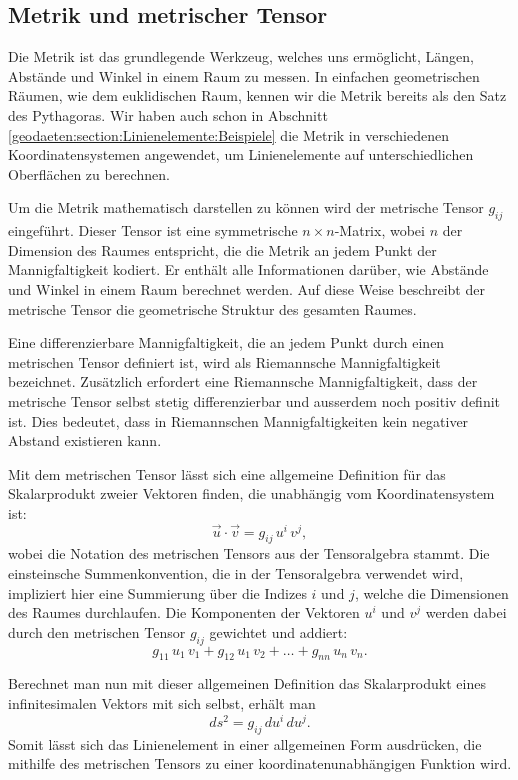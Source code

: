 \subsection{Metrik und metrischer Tensor}

Die Metrik ist das grundlegende Werkzeug, welches uns ermöglicht, Längen, Abstände und Winkel in einem Raum zu messen.
In einfachen geometrischen Räumen, wie dem euklidischen Raum, kennen wir die Metrik bereits als den Satz des Pythagoras.
Wir haben auch schon in Abschnitt \ref{geodaeten:section:Linienelemente:Beispiele} die Metrik in verschiedenen Koordinatensystemen angewendet, um Linienelemente auf unterschiedlichen Oberflächen zu berechnen.

Um die Metrik mathematisch darstellen zu können wird der metrische Tensor $g_{ij}$ eingeführt.
Dieser Tensor ist eine symmetrische $n \times n$-Matrix, wobei $n$ der Dimension des Raumes entspricht, die die Metrik an jedem Punkt der Mannigfaltigkeit kodiert.
Er enthält alle Informationen darüber, wie Abstände und Winkel in einem Raum berechnet werden.
Auf diese Weise beschreibt der metrische Tensor die geometrische Struktur des gesamten Raumes.

Eine differenzierbare Mannigfaltigkeit, die an jedem Punkt durch einen metrischen Tensor definiert ist, wird als Riemannsche Mannigfaltigkeit bezeichnet. Zusätzlich erfordert eine Riemannsche Mannigfaltigkeit, dass der metrische Tensor selbst stetig differenzierbar und ausserdem noch positiv definit ist. 
Dies bedeutet, dass in Riemannschen Mannigfaltigkeiten kein negativer Abstand existieren kann.

Mit dem metrischen Tensor lässt sich eine allgemeine Definition für das Skalarprodukt zweier Vektoren finden, die unabhängig vom Koordinatensystem ist:
\begin{equation}
	\vec{u} \cdot \vec{v} = g_{ij} \, u^i \, v^j ,
\end{equation}
wobei die Notation des metrischen Tensors aus der Tensoralgebra stammt.
Die einsteinsche Summenkonvention, die in der Tensoralgebra verwendet wird, impliziert hier eine Summierung über die Indizes $i$ und $j$, welche die Dimensionen des Raumes durchlaufen.
Die Komponenten der Vektoren $u^i$ und $v^j$ werden dabei durch den metrischen Tensor $g_{ij}$ gewichtet und addiert:
\begin{equation}
	g_{11} \, u_1 \, v_1 + g_{12} \, u_1 \, v_2 + \dots + g_{nn} \, u_n \, v_n.
\end{equation}

Berechnet man nun mit dieser allgemeinen Definition das Skalarprodukt eines infinitesimalen Vektors mit sich selbst, erhält man
\begin{equation}
	ds^2 = g_{ij} \, du^i \, du^j.
	\label{geodaeten:equation:MetrischerTensor:AllgemeinesLinienelement}
\end{equation}
Somit lässt sich das Linienelement in einer allgemeinen Form ausdrücken, die mithilfe des metrischen Tensors zu einer koordinatenunabhängigen Funktion wird.

